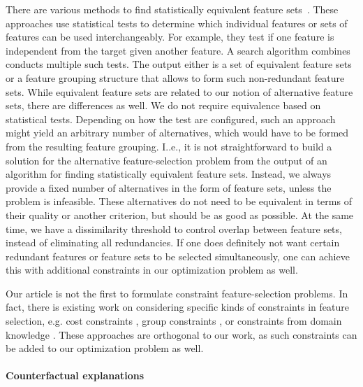 \documentclass{article}
\theoremstyle{definition}
\begin{document}
There are various methods to find statistically equivalent feature sets~\cite{lagani2017feature, borboudakis2021extending}.
These approaches use statistical tests to determine which individual features or sets of features can be used interchangeably.
For example, they test if one feature is independent from the target given another feature.
A search algorithm combines conducts multiple such tests.
The output either is a set of equivalent feature sets or a feature grouping structure that allows to form such non-redundant feature sets.
While equivalent feature sets are related to our notion of alternative feature sets, there are differences as well.
We do not require equivalence based on statistical tests.
Depending on how the test are configured, such an approach might yield an arbitrary number of alternatives, which would have to be formed from the resulting feature grouping.
I..e., it is not straightforward to build a solution for the alternative feature-selection problem from the output of an algorithm for finding statistically equivalent feature sets.
Instead, we always provide a fixed number of alternatives in the form of feature sets, unless the problem is infeasible.
These alternatives do not need to be equivalent in terms of their quality or another criterion, but should be as good as possible.
At the same time, we have a dissimilarity threshold to control overlap between feature sets, instead of eliminating all redundancies.
If one does definitely not want certain redundant features or feature sets to be selected simultaneously, one can achieve this with additional constraints in our optimization problem as well.

Our article is not the first to formulate constraint feature-selection problems.
In fact, there is existing work on considering specific kinds of constraints in feature selection, e.g. cost constraints \cite{paclik2002feature}, group constraints \cite{yuan2006model}, or constraints from domain knowledge \cite{groves2015toward}.
These approaches are orthogonal to our work, as such constraints can be added to our optimization problem as well.

\paragraph{Counterfactual explanations}
\end{document}
